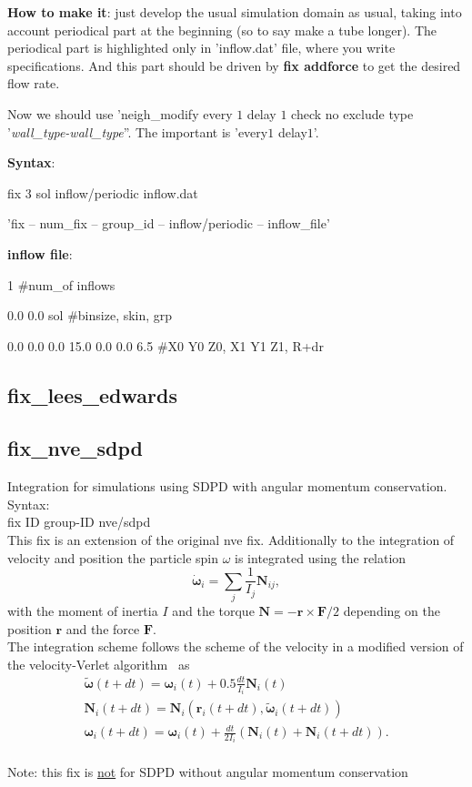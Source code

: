 \documentclass[a4paper,10pt]{scrreprt}
\begin{document}
\textbf{How to make it}: just develop the usual simulation domain as usual, taking into account periodical part at the beginning (so to say make a tube longer). The periodical part is highlighted only in 'inflow.dat' file, where you write specifications. And this part should be driven by \textbf{fix addforce} to get the desired flow rate.

Now we should use 'neigh\_modify    every $1$ delay $1$ check no exclude type '\textit{wall\_type-wall\_type}''. The important is 'every$1$ delay$1$'.

\textbf{Syntax}:

fix    $3$ sol inflow/periodic inflow.dat

'fix -- num\_fix -- group\_id -- inflow/periodic -- inflow\_file' 

\textbf{inflow file}:

1 \#num\_of inflows

0.0 0.0 sol \#binsize, skin, grp

0.0 0.0 0.0 15.0 0.0 0.0 6.5 \#X0 Y0 Z0, X1 Y1 Z1, R+dr

\subsection{fix\_lees\_edwards}


\subsection{fix\_nve\_sdpd}\label{sec:fix/nve/sdpd}

Integration for simulations using SDPD with angular momentum conservation.
\\[2ex]
Syntax:\\[1ex]
fix ID group-ID nve/sdpd
\\[2ex]
This fix is an extension of the original nve fix.
Additionally to the integration of velocity and position the particle spin $\omega$ is integrated using the relation
%
\begin{equation}\label{eq:NEM}
\dot{{\boldsymbol{ \omega}}}_i = \sum_j \frac{1}{I_j}{\mathbf N}_{ij},
\end{equation}
%
with the moment of inertia $I$ and the torque ${\mathbf N} = -{\mathbf r} \times {\mathbf F}/2$ depending on the position ${\mathbf r}$ and the force ${\mathbf F}$.
\\[1ex]
The integration scheme follows the scheme of the velocity in a modified version of the velocity-Verlet algorithm~\cite{Allen_CSL_1991} as 
\begin{eqnarray}
	\tilde{\boldsymbol{\omega}}(t + dt) = \boldsymbol{\omega}_i(t) + 0.5 \frac{dt}{I_i} \mathbf{N}_i(t) \nonumber\\
	\mathbf{N}_i(t + dt) = \mathbf{N}_i(\mathbf{r}_i(t + dt), \tilde{\boldsymbol{\omega}}_i(t+ dt)) \nonumber\\
	\boldsymbol{\omega}_i(t + dt) = \boldsymbol{\omega}_i(t) + \frac{dt}{2 I_i} \left( \mathbf{N}_i(t)+\mathbf{N}_i(t+ dt) \right).
\end{eqnarray}
\\[2ex]
Note: this fix is \underline{not} for SDPD without angular momentum conservation
\end{document}
